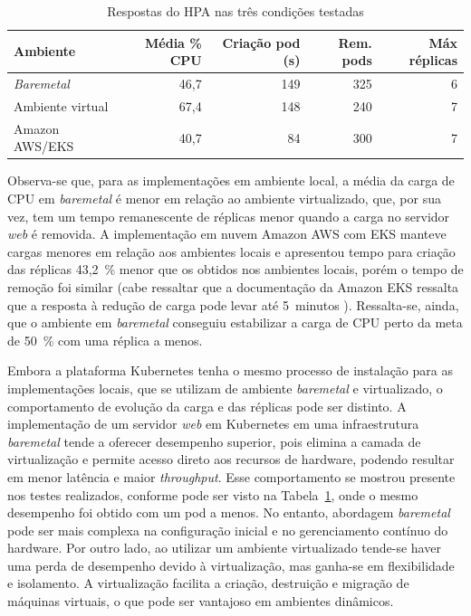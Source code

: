 \documentclass[12pt]{article}
\begin{document}
\begin{table}[htbp]
\centering
\caption{Respostas do HPA nas três condições testadas}
\label{tab:respostas-hpa}

    \begin{tabular}{|l|r|r|r|r|}
        \hline
        \textbf{Ambiente} & \textbf{Média \% CPU} &\textbf{Criação pod (s)} &\textbf{ Rem. pods} & \textbf{Máx réplicas}\\ \hline
        \textit{Baremetal} & 46,7 & 149 & 325 & 6  \\ \hline
        Ambiente virtual & 67,4 & 148 & 240 & 7 \\ \hline
        Amazon AWS/EKS & 40,7 & 84 & 300 & 7 \\ \hline
    \end{tabular}

\end{table}

Observa-se que, para as implementações em ambiente local, a média da carga de CPU em \textit{{baremetal}} é menor em relação ao ambiente virtualizado, que, por sua vez, tem um tempo remanescente de réplicas menor quando a carga no servidor \textit{web} é removida. A implementação em nuvem Amazon AWS com EKS manteve cargas menores em relação aos ambientes locais e apresentou tempo para criação das réplicas 43,2~\% menor que os obtidos nos ambientes locais, porém o tempo de remoção foi similar (cabe ressaltar que a documentação da Amazon EKS ressalta que a resposta à redução de carga pode levar até 5~minutos \cite{amazon_scale_nodate}). Ressalta-se, ainda, que o ambiente em \textit{baremetal} conseguiu estabilizar a carga de CPU perto da meta de 50~\% com uma réplica a menos.

Embora a plataforma Kubernetes tenha o mesmo processo de instalação para as implementações locais, que se utilizam de ambiente \textit{{baremetal}} e virtualizado, o comportamento de evolução da carga e das réplicas pode ser distinto. A implementação de um servidor \textit{web} em Kubernetes em uma infraestrutura \textit{{baremetal}} tende a oferecer desempenho superior, pois elimina a camada de virtualização e permite acesso direto aos recursos de hardware, podendo resultar em menor latência e maior \textit{throughput}. Esse comportamento se mostrou presente nos testes realizados, conforme pode ser visto na Tabela~\ref{tab:respostas-hpa}, onde o mesmo desempenho foi obtido com um pod a menos. No entanto, abordagem \textit{baremetal} pode ser mais complexa na configuração inicial e no gerenciamento contínuo do hardware. Por outro lado, ao utilizar um ambiente virtualizado tende-se haver uma perda de desempenho devido à virtualização, mas ganha-se em flexibilidade e isolamento. A virtualização facilita a criação, destruição e migração de máquinas virtuais, o que pode ser vantajoso em ambientes dinâmicos.
\end{document}
